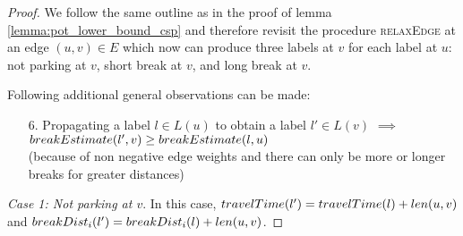 \begin{proof}
	We follow the same outline as in the proof of lemma \ref{lemma:pot_lower_bound_csp} and therefore revisit the procedure \textsc{relaxEdge} at an edge $(u,v) \in E$ which now can produce three labels at $v$ for each label at $u$: not parking at $v$, short break at $v$, and long break at $v$.

	Following additional general observations can be made:

	\begin{enumerate}
		\item[6.] Propagating a label $l \in L(u)$ to obtain a label $l' \in L(v)$ $\implies$ $breakEstimate(l',v) \ge breakEstimate(l,u)$\\(because of non negative edge weights and there can only be more or longer breaks for greater distances)
	\end{enumerate}

	\emph{Case 1: Not parking at $v$}. In this case, $travelTime(l') = travelTime(l) + len(u,v)$ and $breakDist_i(l') = breakDist_i(l) + len(u,v)$.


\end{proof}
